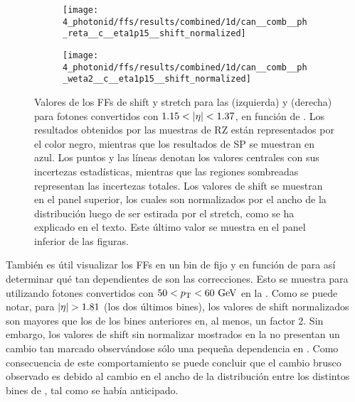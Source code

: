 \begin{figure}[ht!]
    \centering
    \begin{subfigure}[h]{0.49\linewidth}
        \centering
        \texttt{[image: 4\_photonid/ffs/results/combined/1d/can\_\_comb\_\_ph\_reta\_\_c\_\_eta1p15\_\_shift\_normalized]}
        \caption{\reta}
        \label{fig:ss_corrections:ffs:reslts:ffs:reta}
    \end{subfigure}
    \hfill
    \begin{subfigure}[h]{0.49\linewidth}
        \centering
        \texttt{[image: 4\_photonid/ffs/results/combined/1d/can\_\_comb\_\_ph\_weta2\_\_c\_\_eta1p15\_\_shift\_normalized]}
        \caption{\weta}
        \label{fig:ss_corrections:ffs:reslts:ffs:weta}
    \end{subfigure}
    \caption{Valores de los \acp{FF} de shift y stretch para las \reta (izquierda) y \weta (derecha) para fotones convertidos con \(1.15<\abseta<1.37\), en función de \pt. Los resultados obtenidos por las muestras de \ac{RZ} están representados por el color negro, mientras que los resultados de \ac{SP} se muestran en azul. Los puntos y las líneas denotan los valores centrales con sus incertezas estadísticas, mientras que las regiones sombreadas representan las incertezas totales. Los valores de shift se muestran en el panel superior, los cuales son normalizados por el ancho de la distribución luego de ser estirada por el stretch, como se ha explicado en el texto. Este último valor se muestra en el panel inferior de las figuras.}
    \label{fig:ss_corrections:ffs:reslts:ffs}
\end{figure}

También es útil visualizar los \acp{FF} en un bin de \pt fijo y en función de \abseta para así determinar qué tan dependientes de \abseta son las correcciones. Esto se muestra para \wstot utilizando fotones convertidos con \(50<p_{\text{T}}<60~\text{GeV}\) en la \Fig{\ref{fig:ss_corrections:ffs:reslts:ffs_eta_wstot}}. Como se puede notar, para \(\abseta>1.81\) (los dos últimos bines), los valores de shift normalizados son mayores que los de los bines anteriores en, al menos, un factor 2. Sin embargo, los valores de shift sin normalizar mostrados en la \Fig{\ref{fig:ss_corrections:ffs:reslts:ffs_eta_wstot:raw_shift}} no presentan un cambio tan marcado observándose sólo una pequeña dependencia en \abseta. Como consecuencia de este comportamiento se puede concluir que el cambio brusco observado es debido al cambio en el ancho de la distribución entre los distintos bines de \abseta, tal como se había anticipado.


